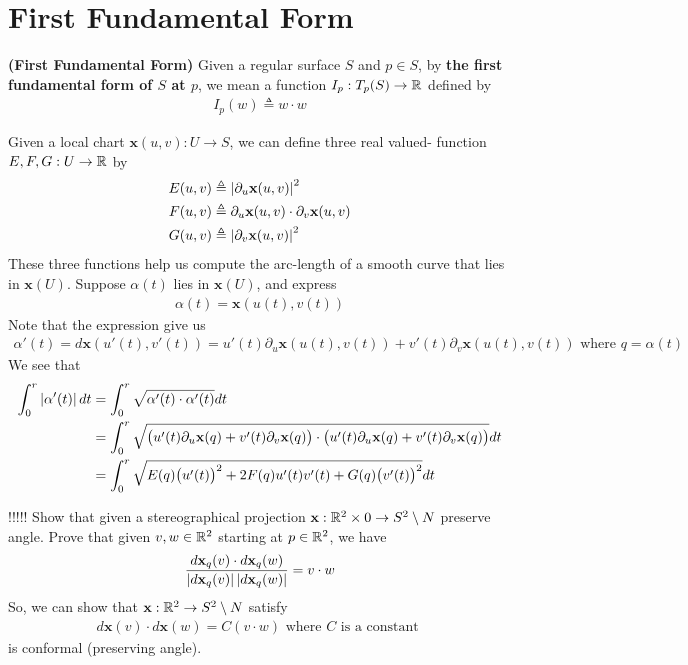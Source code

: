 \documentclass{report}
\begin{document}
\section{First Fundamental Form}
\begin{definition}
\textbf{(First Fundamental Form)} Given a regular surface $S$ and $p\in  S$, by \textbf{the first fundamental form of $S$ at $p$}, we mean a function $I_p:T_p(S)\rightarrow \mathbb{R}$ defined by 
\begin{align*}
I_p(w)\triangleq w\cdot w
\end{align*}
\end{definition}
\begin{mdframed}
Given a local chart $\textbf{x}(u,v):U\rightarrow S$, we can define three real valued- function $E,F,G: U\rightarrow \mathbb{R}$ by 
\begin{align*}
E(u,v)&\triangleq  \left|\partial_u \textbf{x}(u,v)\right|^2 \\
F(u,v)&\triangleq  \partial_u\textbf{x}(u,v)\cdot \partial_v \textbf{x}(u,v)\\
G(u,v)&\triangleq \left|\partial_v \textbf{x}(u,v)\right|^2
\end{align*}
These three functions help us compute the arc-length of a smooth curve that lies in $\textbf{x}(U)$. Suppose $\alpha (t)$ lies in $\textbf{x}(U)$, and express 
\begin{align*}
\alpha (t)=\textbf{x}(u(t),v(t))
\end{align*}
Note that the expression give us 
\begin{align*}
\alpha'(t)=d\textbf{x}(u'(t),v'(t))=u'(t)\partial_u \textbf{x}(u(t),v(t))+v'(t)\partial_v \textbf{x}(u(t),v(t))\text{ where $q=\alpha (t)$ }
\end{align*}
We see that 
\begin{align*}
  \int_0^r \left|\alpha '(t)\right|dt&= \int_0^r \sqrt{\alpha '(t)\cdot \alpha '(t)} dt\\
  &=\int_0^r \sqrt{\big(u'(t)\partial_u \textbf{x}(q)+v'(t)\partial_v \textbf{x}(q) \big)\cdot \big(u'(t)\partial_u \textbf{x}(q)+v'(t)\partial_v \textbf{x}(q) \big)}dt\\
  &=\int_0^r \sqrt{E(q)\big(u'(t) \big)^2 + 2F(q)u'(t)v'(t)+G(q)\big(v'(t) \big)^2} dt
\end{align*}
\end{mdframed}
\begin{mdframed}
!!!!! Show that given a stereographical projection $\textbf{x}:\mathbb{R}^2 \times 0 \rightarrow S^2\setminus N$ preserve angle. Prove that given $v,w \in\mathbb{R}^2$ starting at $p\in\mathbb{R}^2$, we have 
\begin{align*}
\frac{d\textbf{x}_q(v)\cdot d\textbf{x}_q(w)}{\left|d\textbf{x}_q(v)\right|\left|d\textbf{x}_q(w)\right|}=v\cdot w
\end{align*}
So, we can show that  $\textbf{x}:\mathbb{R}^2 \rightarrow S^2 \setminus N$ satisfy 
\begin{align*}
d\textbf{x}(v)\cdot d\textbf{x}(w)= C (v\cdot w)\text{ where }C\text{ is a constant }
\end{align*}
is conformal (preserving angle). 
\end{mdframed}
\end{document}
